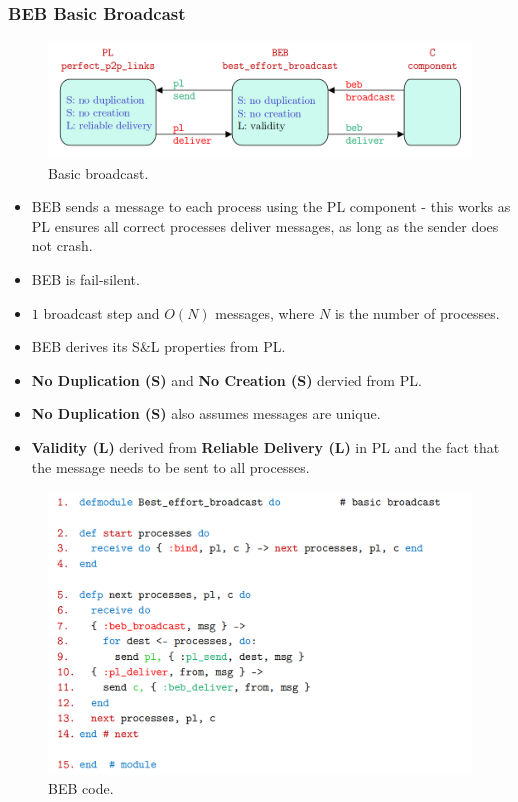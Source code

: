 \documentclass[11pt]{article}
\begin{document}
\subsubsection{BEB Basic Broadcast}
\begin{figure}[htb!]
  \centering
  \caption{Basic broadcast.}
  \includegraphics[scale=0.3]{bebpl}
\end{figure}

\begin{itemize}
  \item BEB sends a message to each process using the PL component - this works as PL ensures all correct processes deliver messages, as long as the sender does not crash.
  \item BEB is fail-silent.
  \item $1$ broadcast step and $O(N)$ messages, where $N$ is the number of processes.
  \item BEB derives its S\&L properties from PL.
\end{itemize}

\begin{itemize}
  \item \textbf{No Duplication (S)} and \textbf{No Creation (S)} dervied from PL.
  \item \textbf{No Duplication (S)} also assumes messages are unique.
  \item \textbf{Validity (L)} derived from \textbf{Reliable Delivery (L)} in PL and the fact that the message needs to be sent to all processes.
\end{itemize}

\begin{figure}[htb!]
  \centering
  \caption{BEB code.}
  \includegraphics[scale=0.3]{bebcode}
\end{figure}
\end{document}
